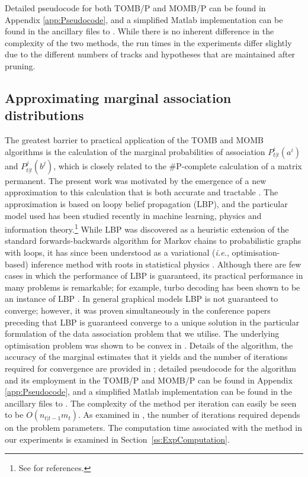 \documentclass[journal,twoside]{IEEEtran}
\theoremstyle{plain}
\begin{document}
Detailed pseudocode for both TOMB/P and MOMB/P can be found in Appendix \ref{app:Pseudocode}, and a simplified Matlab implementation can be found in the ancillary files to \cite{Wil14c}. While there is no inherent difference in the complexity of the two methods, the run times in the experiments differ slightly due to the different numbers of tracks and hypotheses that are maintained after pruning.

\subsection{Approximating marginal association distributions}
\label{ss:BP}
%
{\noindent}The greatest barrier to practical application of the TOMB and MOMB algorithms is the calculation of the marginal probabilities of association $P_{t|t}^i(a^i)$ and $P_{t|t}^j(b^j)$, which is closely related to the \#P-complete calculation of a matrix permanent. The present work was motivated by the emergence of a new approximation to this calculation that is both accurate and tractable \cite{WilLau12}. The approximation is based on loopy belief propagation (LBP), and the particular model used has been studied recently in machine learning, physics and information theory.\footnote{See \cite{WilLau12,Von13} for references.} While LBP was discovered as a heuristic extension of the standard forwards-backwards algorithm for Markov chains to probabilistic graphs with loops, it has since been understood as a variational (\textit{i.e.}\xspace, optimisation-based) inference method with roots in statistical physics \cite{YedFre05}. Although there are few cases in which the performance of LBP is guaranteed, its practical performance in many problems is remarkable; for example, turbo decoding has been shown to be an instance of LBP \cite{McEMac98}. In general graphical models LBP is not guaranteed to converge; however, it was proven simultaneously in the conference papers preceding \cite{WilLau12,Von13} that LBP is guaranteed converge to a unique solution in the particular formulation of the data association problem that we utilise. The underlying optimisation problem was shown to be convex in \cite{Von13}. Details of the algorithm, the accuracy of the marginal estimates that it yields and the number of iterations required for convergence are provided in \cite{WilLau12}; detailed pseudocode for the algorithm and its employment in the TOMB/P and MOMB/P can be found in Appendix \ref{app:Pseudocode}, and a simplified Matlab implementation can be found in the ancillary files to \cite{Wil14c}. The complexity of the method per iteration can easily be seen to be $O(n_{t|t-1}m_t)$. As examined in \cite{WilLau12}, the number of iterations required depends on the problem parameters. The computation time associated with the method in our experiments is examined in Section~\ref{ss:ExpComputation}.
\end{document}
